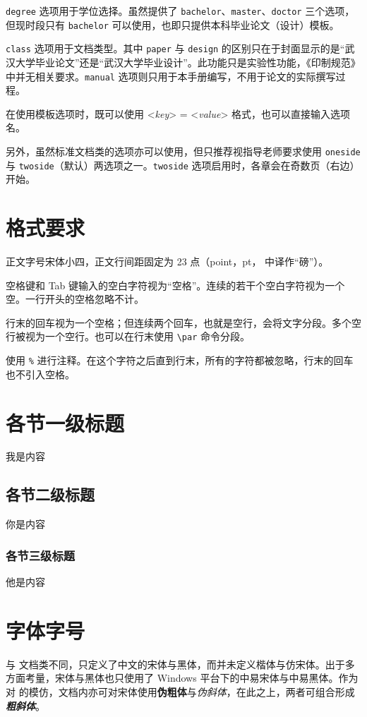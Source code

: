 \verb|degree| 选项用于学位选择。虽然提供了 \verb|bachelor|、\verb|master|、\verb|doctor| 三个选项，但现时段只有 \verb|bachelor| 可以使用，也即只提供本科毕业论文（设计）模板。

\verb|class| 选项用于文档类型。其中 \verb|paper| 与 \verb|design| 的区别只在于封面显示的是“武汉大学毕业论文”还是“武汉大学毕业设计”。此功能只是实验性功能，《印制规范》中并无相关要求。\verb|manual| 选项则只用于本手册编写，不用于论文的实际撰写过程。

在使用模板选项时，既可以使用 <\textit{key}> = <\textit{value}> 格式，也可以直接输入选项名。

另外，虽然标准文档类的选项亦可以使用，但只推荐视指导老师要求使用 \verb|oneside| 与 \verb|twoside|（默认）两选项之一。\verb|twoside| 选项启用时，各章会在奇数页（右边）开始。

\section{格式要求}
正文字号宋体小四，正文行间距固定为 23 点（point，pt， 中译作“磅”）。

空格键和 Tab 键输入的空白字符视为“空格”。连续的若干个空白字符视为一个空。一行开头的空格忽略不计。\par
行末的回车视为一个空格；但连续两个回车，也就是空行，会将文字分段。多个空行被视为一个空行。也可以在行末使用 \verb|\par| 命令分段。

使用 \verb|%| 进行注释。在这个字符之后直到行末，所有的字符都被忽略，行末的回车也不引入空格。%

\section{各节一级标题}
我是内容

\subsection{各节二级标题}
你是内容

\subsubsection{各节三级标题}
他是内容

\section{字体字号}
与 \CTeX 文档类不同，\WhuThesis 只定义了中文的宋体与{\heiti 黑体}，而并未定义楷体与仿宋体。出于多方面考量，宋体与黑体也只使用了 Windows 平台下的中易宋体与中易黑体。作为对  的模仿，文档内亦可对宋体使用\textbf{伪粗体}与\textit{伪斜体}，在此之上，两者可组合形成\textbf{\textit{粗斜体}}。


